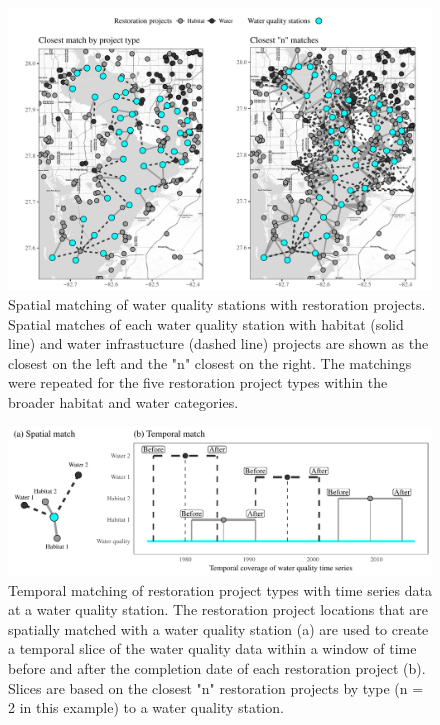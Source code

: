 \documentclass[]{article}
\begin{document}
\begin{figure}
\includegraphics[width=\textwidth]{figs/spmtch-1} \caption{Spatial matching of water quality stations with restoration projects. Spatial matches of each water quality station with habitat (solid line) and water infrastucture (dashed line) projects are shown as the closest on the left and the "n" closest on the right.  The matchings were repeated for the five restoration project types within the broader habitat and water categories.}\label{fig:spmtch}
\end{figure}

\begin{figure}
\includegraphics[width=\textwidth]{figs/tmmtch-1} \caption{Temporal matching of restoration project types with time series data at a water quality station.  The restoration project locations that are spatially matched with a water quality station (a) are used to create a temporal slice of the water quality data within a window of time before and after the completion date of each restoration project (b).  Slices are based on the closest "n" restoration projects by type (n = 2 in this example) to a water quality station.}\label{fig:tmmtch}
\end{figure}
\end{document}
